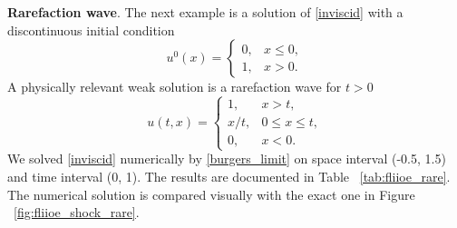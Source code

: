 \documentclass[../include.tex]{subfiles}
\begin{document}
\textbf{Rarefaction wave}. The next example is a solution of \eqref{inviscid} with a discontinuous initial condition
\begin{equation}
	u^0(x) =
	\begin{cases}
		0, &x\leq 0,\nonumber\\
		1, &x>0.\nonumber
	\end{cases}
\end{equation}
A physically relevant weak solution is a rarefaction wave \cite{olv, lev, whitham} for $ t>0 $
\begin{equation}
	\label{inviscid_rare_sol}
	u(t,x) =
	\begin{cases}
		1, &x>t,\nonumber\\
		x/t, &0 \leq x \leq t,\nonumber\\
		0, &x<0.\nonumber
	\end{cases}
\end{equation}
We solved \eqref{inviscid} numerically by \eqref{burgers_limit} on space interval (-0.5, 1.5) and time interval (0, 1). The results are documented in Table ~\ref{tab:fliioe_rare}. The numerical solution is compared visually with the exact one in Figure  ~\ref{fig:fliioe_shock_rare}.
\end{document}
